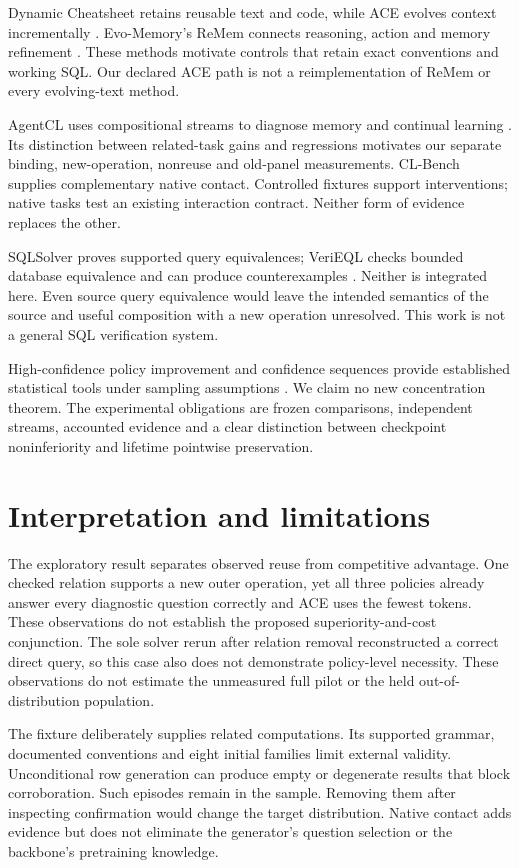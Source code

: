 \documentclass[10pt,twocolumn]{article}
\begin{document}
Dynamic Cheatsheet retains reusable text and code, while ACE evolves context
incrementally \citep{suzgun2025dynamic,zhang2025ace}. Evo-Memory's ReMem connects
reasoning, action and memory refinement \citep{wei2025evomemory}. These methods
motivate controls that retain exact conventions and working SQL. Our declared
ACE path is not a reimplementation of ReMem or every evolving-text method.

AgentCL uses compositional streams to diagnose memory and continual learning
\citep{shu2026agentcl}. Its distinction between related-task gains and
regressions motivates our separate binding, new-operation, nonreuse and old-panel
measurements. CL-Bench supplies complementary native contact. Controlled
fixtures support interventions; native tasks test an existing interaction
contract. Neither form of evidence replaces the other.

SQLSolver proves supported query equivalences; VeriEQL checks bounded database
equivalence and can produce counterexamples
\citep{ding2023sqlsolver,he2024verieql}. Neither is integrated here. Even source
query equivalence would leave the intended semantics of the source and useful
composition with a new operation unresolved. This work is not a general SQL
verification system.

High-confidence policy improvement and confidence sequences provide established
statistical tools under sampling assumptions
\citep{thomas2015hcpi,howard2021confidence}. We claim no new concentration theorem.
The experimental obligations are frozen comparisons, independent streams,
accounted evidence and a clear distinction between checkpoint noninferiority
and lifetime pointwise preservation.
\FloatBarrier

\section{Interpretation and limitations}
The exploratory result separates observed reuse from competitive advantage.
One checked relation supports a new outer operation, yet all three policies
already answer every diagnostic question correctly and ACE uses the fewest
tokens. These observations do not establish the proposed superiority-and-cost
conjunction. The sole solver rerun after relation removal reconstructed a
correct direct query, so this case also does not demonstrate policy-level
necessity. These observations do not estimate the unmeasured full pilot or the held
out-of-distribution population.

The fixture deliberately supplies related computations. Its supported grammar,
documented conventions and eight initial families limit external validity.
Unconditional row generation can produce empty or degenerate results that block
corroboration. Such episodes remain in the sample. Removing them after inspecting
confirmation would change the target distribution. Native contact adds evidence
but does not eliminate the generator's question selection or the backbone's
pretraining knowledge.
\end{document}
